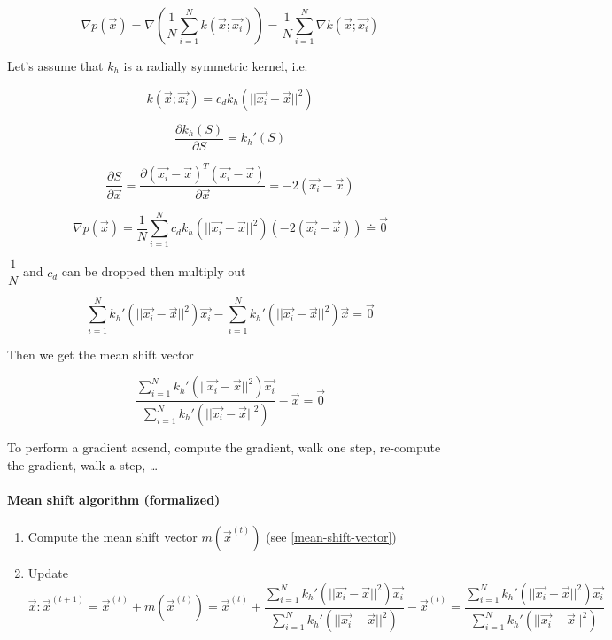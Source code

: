 \begin{equation*}
  \nabla p(\vec{x}) = \nabla (\dfrac{1}{N} \sum_{i=1}^N k(\vec{x}; \vec{x_i})) =  \dfrac{1}{N} \sum_{i=1}^N \nabla k(\vec{x}; \vec{x_i})
\end{equation*}

Let's assume that $k_h$ is a radially symmetric kernel, i.e.\

\begin{equation*}
  k(\vec{x}; \vec{x_i}) = c_d k_h(||\vec{x_i} - \vec{x}||^2)
\end{equation*}

\begin{equation*}
  \dfrac{\partial k_h(S)}{\partial S} = k_h'(S)
\end{equation*}

\begin{equation*}
  \dfrac{\partial S}{\partial \vec{x}} = \dfrac{\partial{(\vec{x_i} - \vec{x})}^T (\vec{x_i} - \vec{x})}{\partial \vec{x}} = -2 (\vec{x_i} - \vec{x})
\end{equation*}

\begin{equation*}
  \nabla p(\vec{x}) = \dfrac{1}{N} \sum_{i=1}^N c_d k_h(||\vec{x_i} - \vec{x}||^2) (-2 (\vec{x_i} - \vec{x})) \doteq \vec{0}
\end{equation*}

$\dfrac{1}{N}$ and $c_d$ can be dropped then multiply out

\begin{equation*}
  \sum_{i=1}^N k_h'(||\vec{x_i} - \vec{x}||^2) \vec{x_i} - \sum_{i=1}^N k_h'(||\vec{x_i} - \vec{x}||^2) \vec{x} = \vec{0}
\end{equation*}

Then we get the mean shift vector

\begin{equation}
  \label{mean-shift-vector}
  \dfrac{\sum_{i=1}^N k_h'(||\vec{x_i} - \vec{x}||^2) \vec{x_i}}{\sum_{i=1}^N k_h'(||\vec{x_i} - \vec{x}||^2)} - \vec{x} = \vec{0}
\end{equation}

To perform a gradient acsend, compute the gradient, walk one step, re-compute the gradient, walk a step, \ldots

\paragraph{Mean shift algorithm (formalized)}
\begin{enumerate}
  \item Compute the mean shift vector $m(\vec{x}^{(t)})$ (see \ref{mean-shift-vector})
  \item Update $\vec{x}:\vec{x}^{(t+1)} = \vec{x}^{(t)} + m(\vec{x}^{(t)}) = \vec{x}^{(t)} + \dfrac{\sum_{i=1}^N k_h'(||\vec{x_i} - \vec{x}||^2) \vec{x_i}}{\sum_{i=1}^N k_h'(||\vec{x_i} - \vec{x}||^2)} - \vec{x}^{(t)}= \dfrac{\sum_{i=1}^N k_h'(||\vec{x_i} - \vec{x}||^2) \vec{x_i}}{\sum_{i=1}^N k_h'(||\vec{x_i} - \vec{x}||^2)}$
\end{enumerate}


